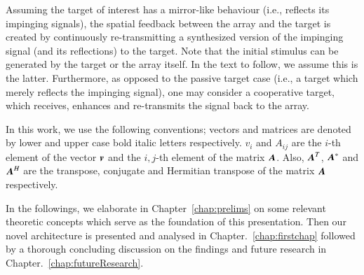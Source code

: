 Assuming the target of interest has a mirror-like behaviour (i.e., reflects its impinging signals), the spatial feedback between the array and the target is created by continuously re-transmitting a synthesized version of the impinging signal (and its reflections) to the target.
Note that the initial stimulus can be generated by the target or the array itself. In the text to follow, we assume this is the latter. 
Furthermore, as opposed to the passive target case (i.e., a target which merely reflects the impinging signal), one may consider a cooperative target, which receives, enhances and re-transmits the signal back to the array.
\par In this work, we use the following conventions; vectors and matrices are denoted by lower and upper case bold italic letters respectively. 
$v_{i}$ and $A_{ij}$ are the $i$-th element of the vector $\boldsymbol{v}$ and the $i,j$-th element of the matrix $\boldsymbol{A}$.
Also, $\boldsymbol{A}^{T}$, $\boldsymbol{A}^{*}$ and $\boldsymbol{A}^{H}$ are the transpose, conjugate and Hermitian transpose of the matrix $\boldsymbol{A}$ respectively.
\par In the followings, we elaborate in Chapter~\ref{chap:prelims} on some relevant theoretic concepts which serve as the foundation of this presentation.
Then our novel architecture is presented and analysed in Chapter.~\ref{chap:firstchap} followed by a thorough concluding discussion on the findings and future research in Chapter.~\ref{chap:futureResearch}.